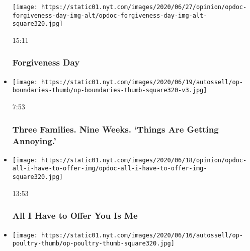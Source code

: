 \begin{itemize}
  \texttt{[image: https://static01.nyt.com/images/2020/06/27/opinion/opdoc-forgiveness-day-img-alt/opdoc-forgiveness-day-img-alt-square320.jpg]}

  15:11

  \hypertarget{forgiveness-day}{%
  \subsubsection{Forgiveness Day}\label{forgiveness-day}}
\item
  \href{https://www.nytimes.com/video/opinion/100000007184142/coronavirus-pandemic-parenting.html?action=click\&module=video-series-bar\&region=header\&pgtype=Article\&playlistId=video/opinion}{}

  \texttt{[image: https://static01.nyt.com/images/2020/06/19/autossell/op-boundaries-thumb/op-boundaries-thumb-square320-v3.jpg]}

  7:53

  \hypertarget{three-families-nine-weeks-things-are-getting-annoying}{%
  \subsubsection{Three Families. Nine Weeks. `Things Are Getting
  Annoying.'}\label{three-families-nine-weeks-things-are-getting-annoying}}
\item
  \href{https://www.nytimes.com/video/opinion/100000007133685/all-i-have-to-offer-you-is-me.html?action=click\&module=video-series-bar\&region=header\&pgtype=Article\&playlistId=video/opinion}{}

  \texttt{[image: https://static01.nyt.com/images/2020/06/18/opinion/opdoc-all-i-have-to-offer-img/opdoc-all-i-have-to-offer-img-square320.jpg]}

  13:53

  \hypertarget{all-i-have-to-offer-you-is-me}{%
  \subsubsection{All I Have to Offer You Is
  Me}\label{all-i-have-to-offer-you-is-me}}
\item
  \href{https://www.nytimes.com/video/opinion/100000007184138/coronavirus-tyson-poultry.html?action=click\&module=video-series-bar\&region=header\&pgtype=Article\&playlistId=video/opinion}{}

  \texttt{[image: https://static01.nyt.com/images/2020/06/16/autossell/op-poultry-thumb/op-poultry-thumb-square320.jpg]}


\end{itemize}
